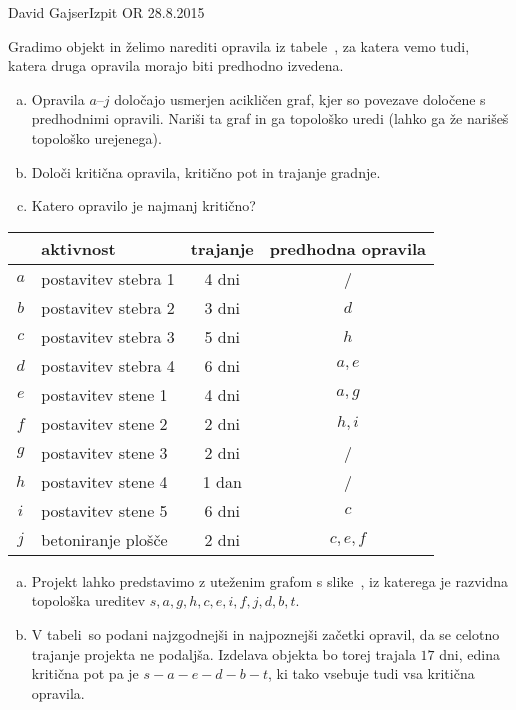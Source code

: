 \begin{naloga}{David Gajser}{Izpit OR 28.8.2015}
\begin{vprasanje}
Gradimo objekt in želimo narediti opravila iz tabele~\tab,
za katera vemo tudi, katera druga opravila morajo biti predhodno izvedena.
\begin{enumerate}[(a)]
\item Opravila $a$--$j$ določajo usmerjen acikličen graf,
kjer so povezave določene s predhodnimi opravili.
Nariši ta graf in ga topološko uredi
(lahko ga že narišeš topološko urejenega).

\item Določi kritična opravila, kritično pot in trajanje gradnje.

\item Katero opravilo je najmanj kritično?
\end{enumerate}

\begin{tabela}
\begin{tabular}{c|l|c|c}
& aktivnost & trajanje & predhodna opravila \\
\hline
$a$ & postavitev stebra 1 & 4 dni & / \\
$b$ & postavitev stebra 2 & 3 dni & $d$ \\
$c$ & postavitev stebra 3 & 5 dni & $h$ \\
$d$ & postavitev stebra 4 & 6 dni & $a, e$ \\
$e$ & postavitev stene 1  & 4 dni & $a, g$ \\
$f$ & postavitev stene 2  & 2 dni & $h, i$ \\
$g$ & postavitev stene 3  & 2 dni & / \\
$h$ & postavitev stene 4  & 1 dan & / \\
$i$ & postavitev stene 5  & 6 dni & $c$ \\
$j$ & betoniranje plošče  & 2 dni & $c, e, f$
\end{tabular}
\end{tabela}
\end{vprasanje}

\begin{odgovor}
\begin{enumerate}[(a)]
\item Projekt lahko predstavimo z uteženim grafom s slike~\fig,
iz katerega je raz\-vid\-na topološka ureditev
$s, a, g, h, c, e, i, f, j, d, b, t$.

\item V tabeli~ so podani
najzgodnejši in najpoznejši začetki opravil,
da se celotno trajanje projekta ne podaljša.
Izdelava objekta bo torej trajala $17$ dni,
edina kritična pot pa je $s - a - e - d - b - t$,
ki tako vsebuje tudi vsa kritična opravila.


\end{enumerate}
\end{odgovor}
\end{naloga}
